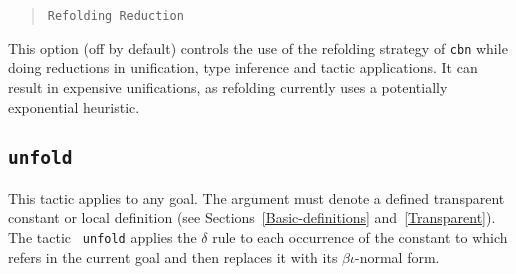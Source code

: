 \begin{coq_example*}

\begin{quote}
{\tt Refolding Reduction}
\end{quote}

This option (off by default) controls the use of the refolding strategy
of {\tt cbn} while doing reductions in unification, type inference and
tactic applications. It can result in expensive unifications, as
refolding currently uses a potentially exponential heuristic.

\subsection{\tt unfold \qualid}
\label{unfold}

This tactic applies to any goal. The argument {\qualid} must denote a
defined transparent constant or local definition (see Sections~\ref{Basic-definitions} and~\ref{Transparent}).  The tactic {\tt
  unfold} applies the $\delta$ rule to each occurrence of the constant
to which {\qualid} refers in the current goal and then replaces it
with its $\beta\iota$-normal form.

\begin{ErrMsgs}
\item {\qualid} 

\end{ErrMsgs}

\end{coq_example*}
